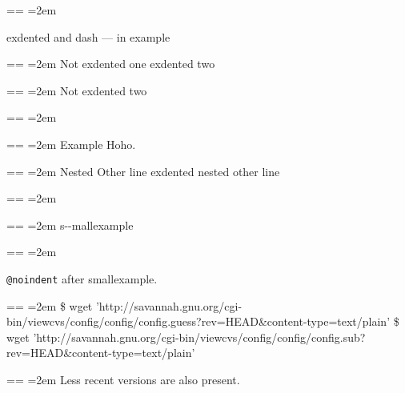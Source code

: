\documentclass{book}
\makeatletter
\newenvironment{GNUTexinfopreformatted}{%
  \par\obeylines\obeyspaces\frenchspacing
  \parskip=\z@\parindent=\z@}{}
\makeatother
\begin{document}
\begin{GNUTexinfopreformatted}
\leftskip=2em\relax\ttfamily%

\end{GNUTexinfopreformatted}
\noindent exdented  and dash --- in example
\begin{GNUTexinfopreformatted}
\leftskip=2em\relax\ttfamily%
Not exdented one
\end{GNUTexinfopreformatted}
\noindent exdented two
\begin{GNUTexinfopreformatted}
\leftskip=2em\relax\ttfamily%
Not exdented two
\end{GNUTexinfopreformatted}
\begin{GNUTexinfopreformatted}
\leftskip=2em\relax\ttfamily%

\end{GNUTexinfopreformatted}
\begin{GNUTexinfopreformatted}
\leftskip=2em\relax\ttfamily%
Example   Hoho.
\end{GNUTexinfopreformatted}
\begin{GNUTexinfopreformatted}
\leftskip=2em\relax\ttfamily%
Nested Other line
\end{GNUTexinfopreformatted}
\noindent exdented nested other line
\begin{GNUTexinfopreformatted}
\leftskip=2em\relax\ttfamily%

\end{GNUTexinfopreformatted}
\begin{GNUTexinfopreformatted}
\leftskip=2em\relax\ttfamily\footnotesize%
s{-}{-}mallexample
\end{GNUTexinfopreformatted}
\begin{GNUTexinfopreformatted}
\leftskip=2em\relax\ttfamily%

\texttt{@noindent} after smallexample.
\end{GNUTexinfopreformatted}
\begin{GNUTexinfopreformatted}
\leftskip=2em\relax\ttfamily\footnotesize%
\$ wget 'http://savannah.gnu.org/cgi-bin/viewcvs/config/config/config.guess?rev=HEAD\&content-type=text/plain'
\$ wget 'http://savannah.gnu.org/cgi-bin/viewcvs/config/config/config.sub?rev=HEAD\&content-type=text/plain'
\end{GNUTexinfopreformatted}
\begin{GNUTexinfopreformatted}
\leftskip=2em\relax\ttfamily%
\noindent{}Less recent versions are also present.

\end{GNUTexinfopreformatted}
\end{document}
